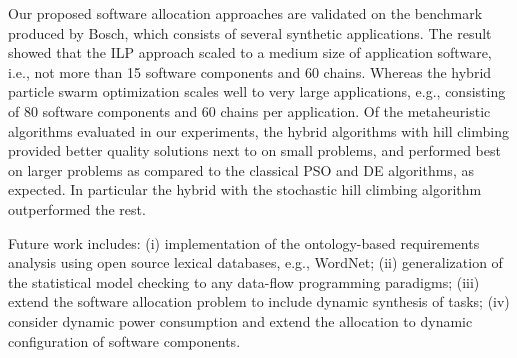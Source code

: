 Our proposed software allocation approaches are validated on the \autosar{} benchmark produced by Bosch, which consists of several synthetic applications. The result showed that the ILP approach scaled to a medium size of application software, i.e., not more than 15 software components and 60 chains. Whereas the hybrid particle swarm optimization scales well to very large applications, e.g., consisting of 80 software components and 60 chains per application. Of the metaheuristic algorithms evaluated in our experiments, the hybrid \pso{} algorithms with hill climbing provided better quality solutions next to \ilp{} on small problems, and performed best on larger problems as compared to the classical PSO and DE algorithms, as expected. In particular the hybrid \pso{} with the stochastic hill climbing algorithm outperformed the rest.

Future work includes: (i) implementation of the ontology-based requirements analysis using open source lexical databases, e.g., WordNet; (ii) generalization of the statistical model checking to any data-flow programming paradigms; (iii) extend the software allocation problem to include dynamic synthesis of tasks; (iv) consider dynamic power consumption and extend the allocation to dynamic configuration of software components.
